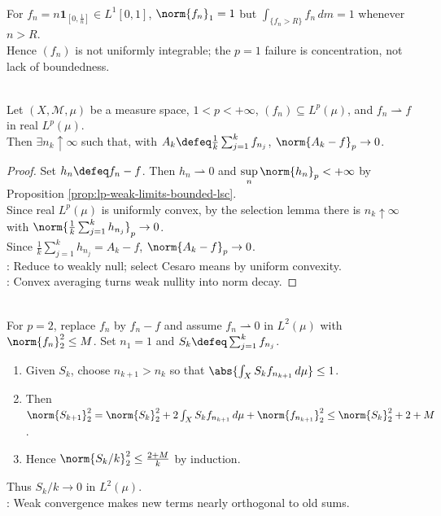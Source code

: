 \begin{remark} \label{rem:l1-concentration-and-uniform-integrability} \\
For $f_n=n\mathbf{1}_{[0,\frac{1}{n}]}\in L^1[0,1]$, $\norm{f_n}_1=1$ but $\int_{\{f_n>R\}}f_n\,dm=1$ whenever $n>R$.\\
Hence $(f_n)$ is not uniformly integrable; the $p=1$ failure is concentration, not lack of boundedness.
\end{remark}

\begin{theorem} \label{thm:banach-saks-lp} \\
Let $(X,\mathcal M,\mu)$ be a measure space, $1<p<+\infty$, $(f_n)\subseteq L^p(\mu)$, and $f_n\rightharpoonup f$ in real $L^p(\mu)$.\\
Then $\exists n_k\uparrow\infty$ such that, with $A_k\defeq\frac{1}{k}\sum_{j=1}^kf_{n_j}$, $\norm{A_k-f}_p\to0$.
\begin{proof}
Set $h_n\defeq f_n-f$. Then $h_n\rightharpoonup0$ and $\sup\limits_n\norm{h_n}_p<+\infty$ by Proposition \ref{prop:lp-weak-limits-bounded-lsc}.\\
Since real $L^p(\mu)$ is uniformly convex, by the selection lemma there is $n_k\uparrow\infty$ with $\norm{\frac{1}{k}\sum_{j=1}^kh_{n_j}}_p\to0$.\\
Since $\frac{1}{k}\sum_{j=1}^kh_{n_j}=A_k-f$, $\norm{A_k-f}_p\to0$.\\
: Reduce to weakly null; select Cesaro means by uniform convexity.\\
: Convex averaging turns weak nullity into norm decay.
\end{proof}
\end{theorem}

\begin{remark} \label{rem:banach-saks-l2-selection-estimate} \\
For $p=2$, replace $f_n$ by $f_n-f$ and assume $f_n\rightharpoonup0$ in $L^2(\mu)$ with $\norm{f_n}_2^2\leq M$. Set $n_1=1$ and $S_k\defeq\sum_{j=1}^kf_{n_j}$.
\begin{enumerate}[label=(\roman*)]
\setlength{\itemsep}{0pt}
\item Given $S_k$, choose $n_{k+1}>n_k$ so that $\abs{\int_X S_kf_{n_{k+1}}\,d\mu}\leq1$.
\item Then $\norm{S_{k+1}}_2^2=\norm{S_k}_2^2+2\int_X S_kf_{n_{k+1}}\,d\mu+\norm{f_{n_{k+1}}}_2^2\leq\norm{S_k}_2^2+2+M$.
\item Hence $\norm{S_k/k}_2^2\leq\frac{2+M}{k}$ by induction.
\end{enumerate}
Thus $S_k/k\to0$ in $L^2(\mu)$.\\
: Weak convergence makes new terms nearly orthogonal to old sums.
\end{remark}

